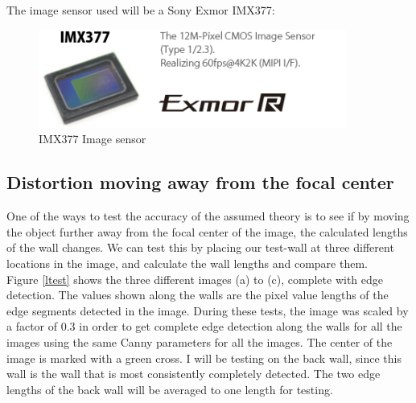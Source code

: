 The image sensor used will be a Sony Exmor IMX377:
\begin{figure}[H]
\centering
\includegraphics[width=0.9\textwidth]{fig/imx377}
  \caption{IMX377 Image sensor}
  \label{fig:sensor}
\end{figure}

\newpage



\subsection{Distortion moving away from the focal center}
\label{lens}
One of the ways to test the accuracy of the assumed theory is to see if by moving the object further away from the focal center of the image, the calculated lengths of the wall changes. We can test this by placing our test-wall at three different locations in the image, and calculate the wall lengths and compare them.\\

Figure \ref{ltest} shows the three different images (a) to (c), complete with edge detection. The values shown along the walls are the pixel value lengths of the edge segments detected in the image. During these tests, the image was scaled by a factor of $0.3$ in order to get complete edge detection along the walls for all the images using the same Canny parameters for all the images. The center of the image is marked with a green cross. I will be testing on the back wall, since this wall is the wall that is most consistently completely detected. The two edge lengths of the back wall will be averaged to one length for testing.\\

